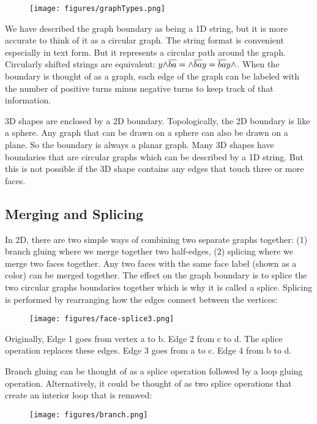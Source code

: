 \documentclass[acmtog]{acmart}
\begin{document}
\begin{figure}[H]
\centering
\texttt{[image: figures/graphTypes.png]}
\end{figure}

We have described the graph boundary as being a 1D string, but it is more
accurate to think of it as a circular graph. The string format is convenient
especially in text form. But it represents a circular path around
the graph. Circularly shifted strings are equivalent:
$y{\wedge} \overline{ba} = {\wedge} \overline{ba}y = \overline{ba}y {\wedge}$. When the
boundary is thought of as a graph, each edge of the graph can be labeled with
the number of positive turns minus negative turns to keep track of that
information.

3D shapes are enclosed by a 2D boundary. Topologically, the 2D boundary is like
a sphere. Any graph that can be drawn on a sphere can also be drawn on a plane.
So the boundary is always a planar graph. Many 3D shapes have boundaries that
are circular graphs which can be described by a 1D string. But this is not
possible if the 3D shape contains any edges that touch three or more faces.

\subsection{Merging and Splicing}

In 2D, there are two simple ways of combining two separate graphs together: (1)
branch gluing where we merge together two half-edges, (2) splicing where we
merge two faces together. Any two faces with the same face label (shown as a
color) can be merged together. The effect on the graph boundary is to splice the
two circular graphs boundaries together which is why it is called a splice.
Splicing is performed by rearranging how the edges connect between the vertices:

\begin{figure}[H]
\centering
\texttt{[image: figures/face-splice3.png]}
\end{figure}

Originally, Edge 1 goes from vertex a to b. Edge 2 from c to
d. The splice operation replaces these edges. Edge 3 goes from a
to c. Edge 4 from b to d.

Branch gluing can be thought of as a splice operation followed by a loop gluing
operation. Alternatively, it could be thought of as two splice operations that
create an interior loop that is removed:

\begin{figure}[H]
\centering
\texttt{[image: figures/branch.png]}
\end{figure}
\end{document}
